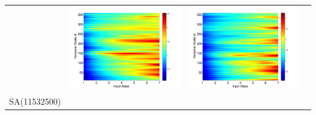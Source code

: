\documentclass[draft,wrr]{AGUTeX}
\begin{document}
\begin{article}
\begin{table}[H]
\begin{tabular}{cccc}
&\begin{minipage}{.3\textwidth}\includegraphics[width=\linewidth]{resultgraph/05585000pep.png}\end{minipage}
&\begin{minipage}{.3\textwidth}\includegraphics[width=\linewidth]{resultgraph/05585000pepq.png}\end{minipage}
\\
SA(11532500)

\end{tabular}
\end{table}
\end{article}
\end{document}
